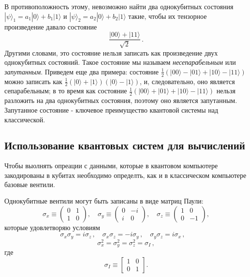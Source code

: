 \documentclass[a4paper,14pt]{extreport} %
\newcommand{\ket}[1]{|#1\rangle}
\begin{document}
В противоположность этому, невозможно найти два однокубитных состояния
$\ket{\psi}_1 = a_1 \ket{0} + b_1 \ket{1}$ и $\ket{\psi}_2 = a_2
\ket{0} + b_2 \ket{1}$ такие, чтобы их тензорное произведение давало состояние
\begin{equation}
\frac{\ket{00}+\ket{11}}{\sqrt{2}} \,.
\label{eq:epr}
\end{equation}
Другими словами, это состояние нельзя записать как произведение двух
однокубитных состояний. Такое состояние мы называем {\em несепарабельным} 
или {\em запутанным}. Приведем еще два примера: состояние $\frac{1}{2}
(\ket{00} - \ket{01} + \ket{10} - \ket{11})$ можно записать как
$\frac{1}{2} (\ket{0} + \ket{1})(\ket{0}-\ket{1})$, и, следовательно, оно 
является сепарабельным; в то время как состояние $\frac{1}{2} (\ket{00} + \ket{01} +
\ket{10} - \ket{11})$ нельзя разложить на два однокубитных состояния, поэтому
оно является запутанным. Запутанное состояние - ключевое преимущество квантовой системы над классической.

\subsection{Использование квантовых систем для вычислений}
Чтобы выолнять опреации с данными, которые в квантовом компьютере закодированы в кубитах необходимо определть, как и в классическом компьютере базовые вентили. 

Однокубитные вентили могут быть записаны в виде матриц Паули:
\begin{equation}
\sigma_x \equiv \begin{pmatrix} 0 & 1 \\ 1 & 0 \end{pmatrix}, \quad
\sigma_y \equiv \begin{pmatrix} 0 & -i \\ i & 0 \end{pmatrix}, \quad
\sigma_z \equiv \begin{pmatrix} 1 & 0 \\ 0 & -1 \end{pmatrix},
\end{equation}
которые удовлетворяю условиям
\begin{equation}
\sigma_x \sigma_y = i \sigma_z \,, \quad
\sigma_x \sigma_z = - i \sigma_y \,, \quad
\sigma_y \sigma_z = i \sigma_x \,, \quad
\label{eq:pauli_rel1}
\end{equation}
\begin{equation}
\sigma_x^2 = \sigma_y^2 =  \sigma_z^2 = \sigma_I \,,
\label{eq:pauli_rel2}
\end{equation}
где 
\begin{equation}
\sigma_I \equiv \begin{bmatrix} 1 & 0 \\ 0 & 1 \end{bmatrix}.
\end{equation}
\end{document}
